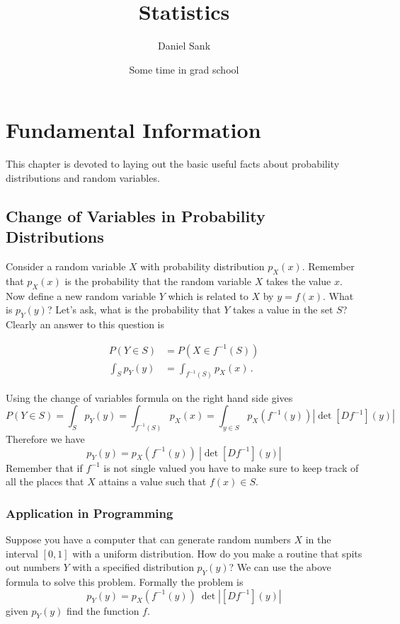 \documentclass{article}
\begin{document}
\title{Statistics}

\author{Daniel Sank}
\date{Some time in grad school}
\maketitle

\section{Fundamental Information}

This chapter is devoted to laying out the basic useful facts about
probability distributions and random variables. 


\subsection{Change of Variables in Probability Distributions}

Consider a random variable $X$ with probability distribution $p_{X}(x)$.
Remember that $p_{X}(x)$ is the probability that the random variable
$X$ takes the value $x$. Now define a new random variable $Y$ which
is related to $X$ by $y=f(x)$. What is $p_{Y}(y)$? Let's ask, \textquotedbl{}what
is the probability that $Y$ takes a value in the set $S$?\textquotedbl{}
Clearly an answer to this question is

\begin{align}
P(Y\in S) &= P(X \in f^{-1}(S)) \\
\int_{S} p_Y (y) &= \int_{f^{-1}(S)}p_{X}(x) \, .
\end{align}

Using the change of variables formula on the right hand side gives
\begin{equation}
P(Y\in S)=\int_{S}p_{Y}(y)=\int_{f^{-1}(S)}p_{X}(x)=\int_{y\in S}p_{X}(f^{-1}(y))|\det[Df^{-1}](y)|
\end{equation}
Therefore we have
\begin{equation}
p_{Y}(y)=p_{X}(f^{-1}(y))~|\det[Df^{-1}](y)|
\end{equation}
Remember that if $f^{-1}$ is not single valued you have to make
sure to keep track of all the places that $X$ attains a value such
that $f(x)\in S$.


\subsubsection{Application in Programming}

Suppose you have a computer that can generate random numbers $X$
in the interval $[0,1]$ with a uniform distribution. How do you make
a routine that spits out numbers $Y$ with a specified distribution
$p_{Y}(y)$? We can use the above formula to solve this problem. Formally
the problem is
\begin{equation}
p_{Y}(y)=p_{X}(f^{-1}(y))~\det|[Df^{-1}](y)|
\end{equation}
given $p_{Y}(y)$ find the function $f$.
\end{document}
